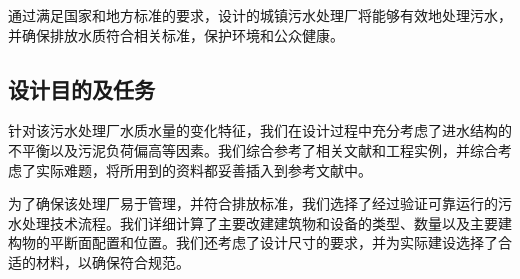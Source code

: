 \begin{table}[H]
	\centering
	\caption{四川省岷江、沱江流域水污染物排放标准\cite{DB5123112016}}
	\label{tab:Water pollutant discharge standards in the Minjiang and Tuojiang River basins of Sichuan Province}%
\end{table}%

通过满足国家和地方标准的要求，设计的城镇污水处理厂将能够有效地处理污水，并确保排放水质符合相关标准，保护环境和公众健康。


\subsection{设计目的及任务}

针对该污水处理厂水质水量的变化特征，我们在设计过程中充分考虑了进水结构的不平衡以及污泥负荷偏高等因素。我们综合参考了相关文献和工程实例，并综合考虑了实际难题，将所用到的资料都妥善插入到参考文献中。

为了确保该处理厂易于管理，并符合排放标准，我们选择了经过验证可靠运行的污水处理技术流程。我们详细计算了主要改建建筑物和设备的类型、数量以及主要建构物的平断面配置和位置。我们还考虑了设计尺寸的要求，并为实际建设选择了合适的材料，以确保符合规范。

